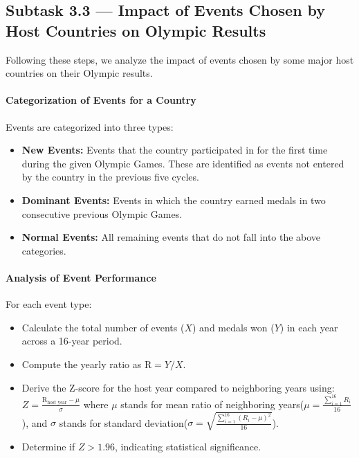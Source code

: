 \documentclass{mcmthesis}
\begin{document}
\subsection{Subtask 3.3 --- Impact of Events Chosen by Host Countries on Olympic Results}


Following these steps, we analyze the impact of events chosen by some major host countries on their Olympic results.

\paragraph{Categorization of Events for a Country}

Events are categorized into three types:
\begin{itemize}
    \item \textbf{New Events:} Events that the country participated in for the first time during the given Olympic Games. These are identified as events not entered by the country in the previous five cycles.
    \item \textbf{Dominant Events:} Events in which the country earned medals in two consecutive previous Olympic Games.
    \item \textbf{Normal Events:} All remaining events that do not fall into the above categories.
\end{itemize}

\paragraph{Analysis of Event Performance}

For each event type:
\begin{itemize}
    \item Calculate the total number of events ($X$) and medals won ($Y$) in each year across a 16-year period.
    \item Compute the yearly ratio as $\text{R} = Y / X$.
    \item Derive the Z-score for the host year compared to neighboring years using:$Z = \frac{\text{R}_{\text{host year}} - \mu}{\sigma}$
    where $\mu$ stands for mean ratio of neighboring years($\mu = \frac{\sum_{i=1}^{16} R_i}{16}$), and $\sigma$ stands for standard deviation($\sigma = \sqrt{\frac{\sum_{i=1}^{16} (R_i - \mu)^2}{16}}$).
    \item Determine if $Z > 1.96$, indicating statistical significance.
\end{itemize}
\end{document}
